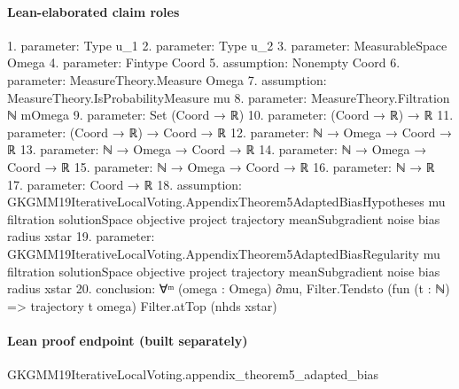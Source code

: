 \documentclass[10pt]{article}
\begin{document}
\paragraph{Lean-elaborated claim roles}\begin{ReviewVerbatim}
1. parameter: Type u_1
2. parameter: Type u_2
3. parameter: MeasurableSpace Omega
4. parameter: Fintype Coord
5. assumption: Nonempty Coord
6. parameter: MeasureTheory.Measure Omega
7. assumption: MeasureTheory.IsProbabilityMeasure mu
8. parameter: MeasureTheory.Filtration ℕ mOmega
9. parameter: Set (Coord → ℝ)
10. parameter: (Coord → ℝ) → ℝ
11. parameter: (Coord → ℝ) → Coord → ℝ
12. parameter: ℕ → Omega → Coord → ℝ
13. parameter: ℕ → Omega → Coord → ℝ
14. parameter: ℕ → Omega → Coord → ℝ
15. parameter: ℕ → Omega → Coord → ℝ
16. parameter: ℕ → ℝ
17. parameter: Coord → ℝ
18. assumption: GKGMM19IterativeLocalVoting.AppendixTheorem5AdaptedBiasHypotheses mu filtration solutionSpace objective project
  trajectory meanSubgradient noise bias radius xstar
19. parameter: GKGMM19IterativeLocalVoting.AppendixTheorem5AdaptedBiasRegularity mu filtration solutionSpace objective project
  trajectory meanSubgradient noise bias radius xstar
20. conclusion: ∀ᵐ (omega : Omega) ∂mu, Filter.Tendsto (fun (t : ℕ) => trajectory t omega) Filter.atTop (nhds xstar)
\end{ReviewVerbatim}

\paragraph{Lean proof endpoint (built separately)}\begin{ReviewVerbatim}
GKGMM19IterativeLocalVoting.appendix_theorem5_adapted_bias
\end{ReviewVerbatim}
\end{document}
